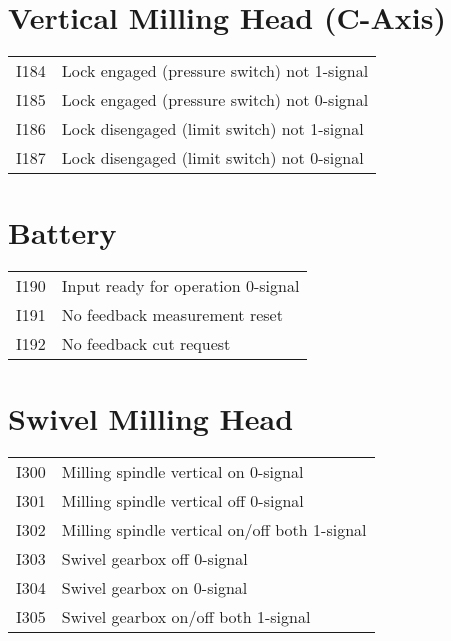 \documentclass[openany,11pt]{book}
\begin{document}
\section*{Vertical Milling Head (C-Axis)}

\begin{table}[!h]
    \begin{tabular}{ll}
    I184 & Lock engaged (pressure switch) not 1-signal \\
    I185 & Lock engaged (pressure switch) not 0-signal \\
    I186 & Lock disengaged (limit switch) not 1-signal \\
    I187 & Lock disengaged (limit switch) not 0-signal \\
    \end{tabular}
\end{table}

\section*{Battery}

\begin{table}[!h]
    \begin{tabular}{ll}
    I190 & Input ready for operation 0-signal \\
    I191 & No feedback measurement reset \\
    I192 & No feedback cut request \\
    \end{tabular}
\end{table}

\section*{Swivel Milling Head}

\begin{table}[!h]
    \begin{tabular}{ll}
    I300 & Milling spindle vertical on 0-signal \\
    I301 & Milling spindle vertical off 0-signal \\
    I302 & Milling spindle vertical on/off both 1-signal \\
    I303 & Swivel gearbox off 0-signal \\
    I304 & Swivel gearbox on 0-signal \\
    I305 & Swivel gearbox on/off both 1-signal \\
    \end{tabular}
\end{table}
\end{document}
